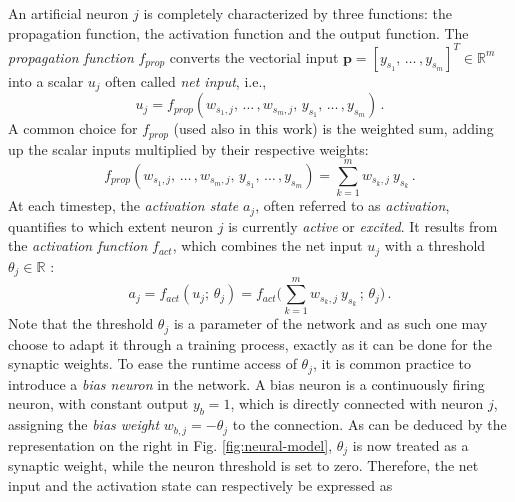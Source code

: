 \documentclass[longtitle]{elsarticle}
\numberwithin{equation}{section}
\theoremstyle{theorem}
\theoremstyle{definition}
\theoremstyle{remark}
\theoremstyle{proposition}
\numberwithin{figure}{section}
\begin{document}
		An artificial neuron $j$ is completely characterized by three functions: the propagation function, the activation function and the output function. The \emph{propagation function} $f_{prop}$ converts the vectorial input $\mathbf{p} = [y_{s_1}, \, \ldots \, , y_{s_m}]^T \in \mathbb{R}^m$ into a scalar $u_{j}$ often called \emph{net input}, i.e.,
		\begin{equation*}
			u_{j} = f_{prop}(w_{s_1,j}, \, \ldots \, , w_{s_m,j}, \, y_{s_1}, \, \ldots \, , y_{s_m}) \, .
		\end{equation*}
		A common choice for $f_{prop}$ (used also in this work) is the weighted sum, adding up the scalar inputs multiplied by their respective weights:
		\begin{equation*}
			f_{prop}(w_{s_1,j}, \, \ldots \, , w_{s_m,j}, \, y_{s_1}, \, \ldots \, , y_{s_m}) = \sum_{k = 1}^m w_{s_k,j} ~ y_{s_k} \, .
		\end{equation*}
		At each timestep, the \emph{activation state} $a_j$, often referred to as \emph{activation}, quantifies to which extent neuron $j$ is currently \emph{active} or \emph{excited}. It results from the \emph{activation function} $f_{act}$, which combines the net input $u_j$ with a threshold $\theta_j \in \mathbb{R}$ \cite{Kri07}: 
		\begin{equation*}
			a_j = f_{act}(u_j; \, \theta_j) = f_{act} \big( \sum_{k = 1}^m w_{s_k,j} ~ y_{s_k} \, ; \, \theta_j \big) \, .
		\end{equation*}
		Note that the threshold $\theta_j$ is a parameter of the network and as such one may choose to adapt it through a training process, exactly as it can be done for the synaptic weights. To ease the runtime access of $\theta_j$, it is common practice to introduce a \emph{bias neuron} in the network. A bias neuron is a continuously firing neuron, with constant output $y_{b} = 1$, which is directly connected with neuron $j$, assigning the \emph{bias weight} $w_{b,j} = - \theta_j$ to the connection. As can be deduced by the representation on the right in Fig. \ref{fig:neural-model}, $\theta_j$ is now treated as a synaptic weight, while the neuron threshold is set to zero. Therefore, the net input and the activation state can respectively be expressed as
\end{document}
